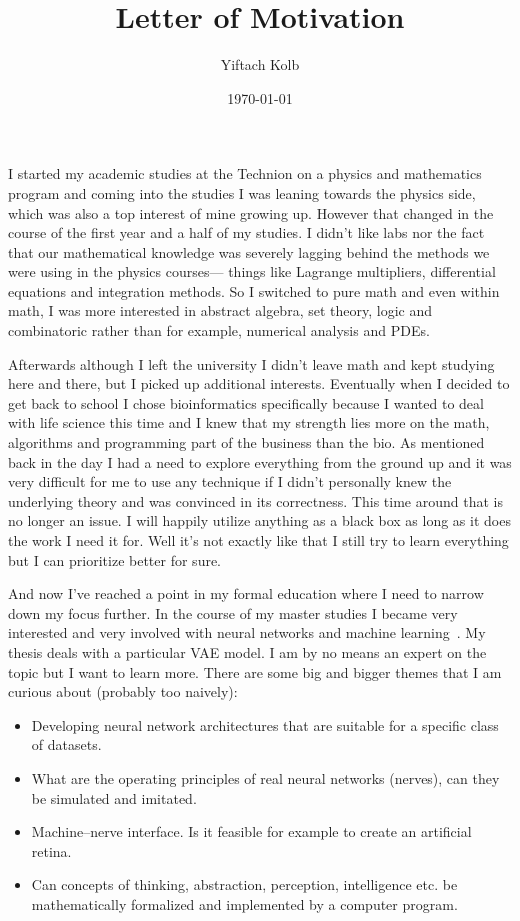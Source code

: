 \documentclass[a4paper,10pt]{article}
\begin{document}

\title{Letter of Motivation}
\author{Yiftach Kolb}
\date{\today}

\maketitle

I started my academic studies at the Technion on a physics and mathematics
program and coming into the studies I was leaning towards the
physics side, which was also a top interest of mine growing up.
However that changed in the course of the first year and a half of my studies.
I didn't like labs nor the fact that our mathematical knowledge was severely
lagging behind the methods we were using in the physics courses---
things like Lagrange
multipliers, differential equations and integration methods.
So I switched to pure math and even within math, I was more interested in
abstract algebra, set theory, logic and combinatoric rather than for example,
numerical analysis and PDEs.

Afterwards although I left the university I didn't leave math and kept studying
here and there, but I picked up additional interests. Eventually when I decided
to get back to school I chose bioinformatics specifically because I
wanted to deal with life science this time and I knew that my strength lies more
on the math, algorithms and programming part of the business than the bio.
As mentioned back in the day I had a
need to explore everything from the ground up and it was very difficult for me
to use any technique if I didn't personally knew the underlying theory and
was convinced in its correctness.
This time around that is no longer an issue. I will
happily utilize anything as a black box as long as it does the work I need it
for. Well it's not exactly like that I still try to learn everything but I can
prioritize better for sure.

And now I've reached a point in my formal education where I need to narrow down
my focus further.
In the course of my master studies I became very interested and very involved
with neural networks and machine learning~\cite{mpgvaeRepo}. My thesis deals with a particular VAE
model.
I am by no means an expert on the topic but I want to learn more.
There are some big and bigger themes that I am curious about (probably too naively):

\begin{itemize}
\item{} Developing neural network architectures that are suitable for a specific
class of datasets.
\item{} What are the operating principles of real neural networks (nerves), can
they be simulated and imitated. 
\item{} Machine--nerve interface. Is it feasible for example to create an
artificial retina.
\item{} Can concepts of thinking, abstraction, perception, intelligence etc. be
mathematically formalized and implemented by a computer program.
\end{itemize}
\end{document}

